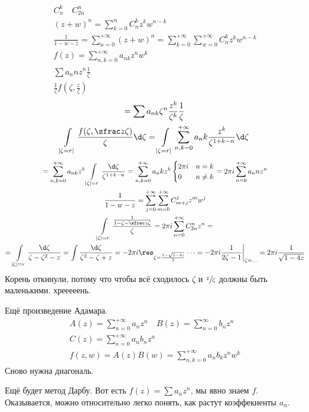\begin{exmp}
	\begin{gather*}
		C_n^k \quad C_{2n}^n \\
		(z + w)^n = \sum_{k=0}^n C_n^k z^k w^{n-k} \\
		\frac1{1-w-z} = \sum_{n=0}^{+\infty} (z+w)^n = \sum_{k=0}^{+\infty} \sum_{w=0}^{+\infty} C_n^k z^k w^{n-k} \\
		f(z) = \sum_{n,k=0}^{+\infty} a_{nk} z^n w^k \\
		\sum a_nn z^n \frac1{\zeta} \\
		\frac1{\zeta} f(\zeta, \frac z{\zeta})
	\end{gather*}\begin{gather*}
		= \sum a_{nk} \zeta^n \frac{z^k}{\zeta^k} \frac1{\zeta} \\
		\int\limits_{|\zeta=r|} \frac{f(\zeta, \sfrac z{\zeta})}{\zeta} \d \zeta
		= \int\limits_{|\zeta=r|} \sum_{n,k=0}^{+\infty} a_nk \frac{z^k}{\zeta^{1+k-n}} \d \zeta
	\end{gather*}\begin{gather*}
		= \sum_{n,k=0}^{+\infty} a_{nk} z^k \int\limits_{|\zeta|=r} \frac{\d \zeta}{\zeta^{1+k-n}}
		= \sum_{n,k=0}^{+\infty} a_nk z^k \begin{cases} 2\pi i & n = k \\ 0 & n \ne k \end{cases}
		= 2\pi i \sum_{n=0}^{+\infty} a_nn z^n \\
		\frac1{1-w-z} = \sum_{j=0}^{+\infty} \sum_{m=0}^{+\infty} C_{m+j}^j z^m w^j \\
		\int\limits_{|\zeta|=r} \frac{\frac1{1-\zeta-\sfrac z{\zeta}}}{\zeta} = 2\pi i \sum_{n=0}^{+\infty} C_{2n}^n z^n = \\
		= \int\limits_{|\zeta|=r} \frac{\d \zeta}{\zeta - \zeta^2 - z}
		= \int \frac{\d \zeta}{\zeta^2 - \zeta + z}
		= -2\pi i \res_{\zeta=\frac{1-\sqrt{1-4z}}2} \dots
		= -2\pi i \frac1{2\zeta-1} \biggr|_{\zeta=\dots}
		= 2\pi i \frac1{\sqrt{1-4z}}
	\end{gather*}
	Корень откинули, потому что чтобы всё сходилось $\zeta$ и $\sfrac z{\zeta}$ должны быть маленькими.
	\TODO хрееееень.

	Ещё произведение Адамара.
	\begin{gather*}
		A(z) = \sum_{n=0}^{+\infty} a_n z^n \quad B(z) = \sum_{n=0}^\infty b_n z^n \\
		C(z) = \sum_{n=0}^{+\infty} a_n b_n z^n \\
		f(z, w) = A(z) B(w) = \sum_{n,k=0}^{+\infty} a_n b_k z^n w^k
	\end{gather*}
	Сново нужна диагональ.

	Ещё будет метод Дарбу.
	Вот есть $f(z) = \sum a_n z^n$, мы явно знаем $f$.
	Оказывается, можно относительно легко понять, как растут коэффекиенты $a_n$.
\end{exmp}
